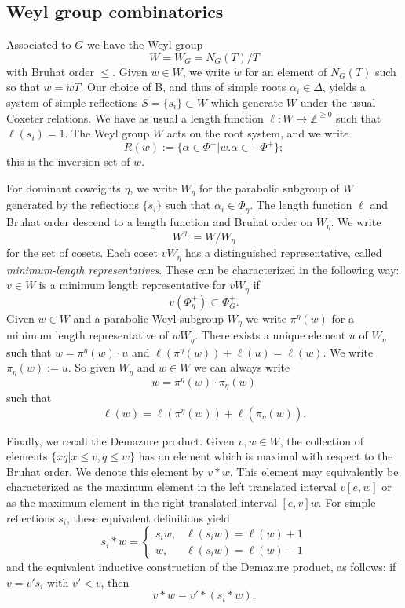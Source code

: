 \documentclass[12pt,reqno]{amsart}
\theoremstyle{definition}
\begin{document}
\subsection{Weyl group combinatorics}
Associated to $G$ we have the Weyl group \[W=W_G=N_G(T)/T\]  with Bruhat order $\leq$. Given $w\in W$, we write $\dot w$ for an element of $N_G(T)$ such so that $w=\dot w T$.  Our choice of B, and thus of simple roots $\alpha_i \in \Delta$, yields a system of simple reflections $S=\{s_i \} \subset W$ which generate $W$ under the usual Coxeter relations. We have as usual a length function $\ell: W \rightarrow \mathbb{Z}^{\geq 0}$ such that $\ell(s_i)=1$. The Weyl group $W$ acts on the root system, and we write \[R(w):=\{ \alpha \in \Phi^+ | w.\alpha \in -\Phi^+\};\] this is the inversion set of $w$.


For dominant coweights $\eta$,  we write $W_{\eta}$ for the parabolic subgroup of $W$ generated by the reflections $\{s_i\}$ such that $\alpha_i \in \Phi_{\eta}$. The length function $\ell$ and Bruhat order descend to a length function and Bruhat order on $W_{\eta}$. We write \[W^{\eta} := W/W_{\eta}\] 
for the set of cosets. Each coset $v W_{\eta}$ has a distinguished representative, called \textit{minimum-length representatives}. These can be characterized in the following way: $v \in W$ is a minimum length representative for $vW_{\eta}$ if \[v(\Phi_{\eta}^+) \subset \Phi_G^+.\] Given $w \in W$ and a parabolic Weyl subgroup $W_{\eta}$ we write $\pi^{\eta}(w)$ for a minimum length representative of $wW_{\eta}$. There exists a unique element $u$ of $W_{\eta}$ such that $w= \pi^{\eta}(w) \cdot u$ and $\ell(\pi^{\eta}(w))+\ell(u)=\ell(w)$. We write $\pi_{\eta}(w):=u$. So given $W_{\eta}$ and $w \in W$ we can always write \[w=\pi^{\eta}(w) \cdot \pi_{\eta}(w)\] such that \[\ell(w)=\ell(\pi^{\eta}(w))+\ell(\pi_{\eta}(w)).\]

Finally, we recall the Demazure product. Given $v, w \in W$, the collection of elements $\{xq| x \leq v, q \leq w\}$ has an element which is maximal with respect to the Bruhat order. We denote this element by $v * w$. This element may equivalently be characterized as the maximum element in the left translated interval $v [e, w]$ or as the maximum element in the right translated interval $[e,v] w$. For simple reflections $s_i$, these equivalent definitions yield 
$$
s_i \ast w = \begin{cases}
s_i w, & \ell(s_iw) =\ell(w)+1 \\
w, & \ell(s_i w) = \ell(w)-1 
\end{cases}
$$
and the equivalent inductive construction of the Demazure product, as follows: if $v=v's_i$ with $v' < v$, then 
$$
v \ast w = v' \ast (s_i \ast w).
$$
\end{document}
